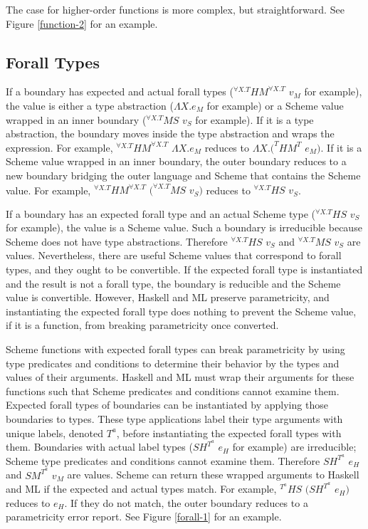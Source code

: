 

The case for higher-order functions is more complex, but straightforward.  See Figure \ref{function-2} for an example.



\subsection{Forall Types}

If a boundary has expected and actual forall types ($^{\forall X.T}HM^{\forall X.T}$ $v_{M}$ for example), the value is either a type abstraction ($\Lambda X.e_{M}$ for example) or a Scheme value wrapped in an inner boundary ($^{\forall X.T}MS$ $v_{S}$ for example).  If it is a type abstraction, the boundary moves inside the type abstraction and wraps the expression.  For example, $^{\forall X.T}HM^{\forall X.T}$ $\Lambda X.e_{M}$ reduces to $\Lambda X.(^{T}HM^{T}$ $e_{M})$.  If it is a Scheme value wrapped in an inner boundary, the outer boundary reduces to a new boundary bridging the outer language and Scheme that contains the Scheme value.  For example, $^{\forall X.T}HM^{\forall X.T}$ $(^{\forall X.T}MS$ $v_{S})$ reduces to $^{\forall X.T}HS$ $v_{S}$.

If a boundary has an expected forall type and an actual Scheme type ($^{\forall X.T}HS$ $v_{S}$ for example), the value is a Scheme value.  Such a boundary is irreducible because Scheme does not have type abstractions.  Therefore $^{\forall X.T}HS$ $v_{S}$ and $^{\forall X.T}MS$ $v_{S}$ are values.  Nevertheless, there are useful Scheme values that correspond to forall types, and they ought to be convertible.  If the expected forall type is instantiated and the result is not a forall type, the boundary is reducible and the Scheme value is convertible.  However, Haskell and ML preserve parametricity, and instantiating the expected forall type does nothing to prevent the Scheme value, if it is a function, from breaking parametricity once converted.

Scheme functions with expected forall types can break parametricity by using type predicates and conditions to determine their behavior by the types and values of their arguments.  Haskell and ML must wrap their arguments for these functions such that Scheme predicates and conditions cannot examine them.  Expected forall types of boundaries can be instantiated by applying those boundaries to types.  These type applications label their type arguments with unique labels, denoted $T^{a}$, before instantiating the expected forall types with them.  Boundaries with actual label types ($SH^{T^{a}}$ $e_{H}$ for example) are irreducible; Scheme type predicates and conditions cannot examine them.  Therefore $SH^{T^{a}}$ $e_{H}$ and $SM^{T^{a}}$ $v_{M}$ are values.  Scheme can return these wrapped arguments to Haskell and ML if the expected and actual types match.  For example, $^{T^{a}}HS$ $(SH^{T^{a}}$ $e_{H})$ reduces to $e_{H}$.  If they do not match, the outer boundary reduces to a parametricity error report.  See Figure \ref{forall-1} for an example.

